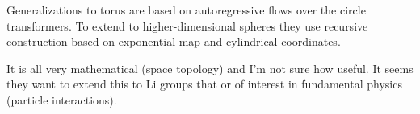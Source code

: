 Generalizations to torus are based on autoregressive flows over the circle transformers.
To extend to higher-dimensional spheres they use recursive construction based on exponential map and cylindrical coordinates.

It is all very mathematical (space topology) and I'm not sure how useful. It seems they want to extend this to Li groups that or of interest in fundamental physics (particle interactions).




